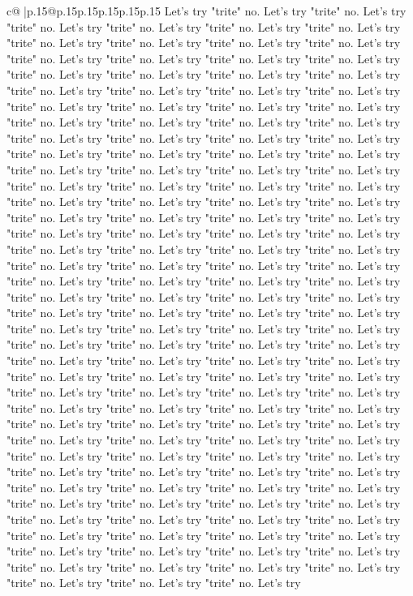 \documentclass{article}
\begin{document}
{\begin{supertabular}{c@{$\;$}|p{.15\linewidth}@{}p{.15\linewidth}p{.15\linewidth}p{.15\linewidth}p{.15\linewidth}p{.15\linewidth}}
{{{Let's try "trite" no. Let's try "trite" no. Let's try "trite" no. Let's try "trite" no. Let's try "trite" no. Let's try "trite" no. Let's try "trite" no. Let's try "trite" no. Let's try "trite" no. Let's try "trite" no. Let's try "trite" no. Let's try "trite" no. Let's try "trite" no. Let's try "trite" no. Let's try "trite" no. Let's try "trite" no. Let's try "trite" no. Let's try "trite" no. Let's try "trite" no. Let's try "trite" no. Let's try "trite" no. Let's try "trite" no. Let's try "trite" no. Let's try "trite" no. Let's try "trite" no. Let's try "trite" no. Let's try "trite" no. Let's try "trite" no. Let's try "trite" no. Let's try "trite" no. Let's try "trite" no. Let's try "trite" no. Let's try "trite" no. Let's try "trite" no. Let's try "trite" no. Let's try "trite" no. Let's try "trite" no. Let's try "trite" no. Let's try "trite" no. Let's try "trite" no. Let's try "trite" no. Let's try "trite" no. Let's try "trite" no. Let's try "trite" no. Let's try "trite" no. Let's try "trite" no. Let's try "trite" no. Let's try "trite" no. Let's try "trite" no. Let's try "trite" no. Let's try "trite" no. Let's try "trite" no. Let's try "trite" no. Let's try "trite" no. Let's try "trite" no. Let's try "trite" no. Let's try "trite" no. Let's try "trite" no. Let's try "trite" no. Let's try "trite" no. Let's try "trite" no. Let's try "trite" no. Let's try "trite" no. Let's try "trite" no. Let's try "trite" no. Let's try "trite" no. Let's try "trite" no. Let's try "trite" no. Let's try "trite" no. Let's try "trite" no. Let's try "trite" no. Let's try "trite" no. Let's try "trite" no. Let's try "trite" no. Let's try "trite" no. Let's try "trite" no. Let's try "trite" no. Let's try "trite" no. Let's try "trite" no. Let's try "trite" no. Let's try "trite" no. Let's try "trite" no. Let's try "trite" no. Let's try "trite" no. Let's try "trite" no. Let's try "trite" no. Let's try "trite" no. Let's try "trite" no. Let's try "trite" no. Let's try "trite" no. Let's try "trite" no. Let's try "trite" no. Let's try "trite" no. Let's try "trite" no. Let's try "trite" no. Let's try "trite" no. Let's try "trite" no. Let's try "trite" no. Let's try "trite" no. Let's try "trite" no. Let's try "trite" no. Let's try "trite" no. Let's try "trite" no. Let's try "trite" no. Let's try "trite" no. Let's try "trite" no. Let's try "trite" no. Let's try "trite" no. Let's try "trite" no. Let's try "trite" no. Let's try "trite" no. Let's try "trite" no. Let's try "trite" no. Let's try "trite" no. Let's try "trite" no. Let's try "trite" no. Let's try "trite" no. Let's try "trite" no. Let's try "trite" no. Let's try "trite" no. Let's try "trite" no. Let's try "trite" no. Let's try "trite" no. Let's try "trite" no. Let's try "trite" no. Let's try "trite" no. Let's try "trite" no. Let's try "trite" no. Let's try "trite" no. Let's try "trite" no. Let's try "trite" no. Let's try "trite" no. Let's try "trite" no. Let's try "trite" no. Let's try "trite" no. Let's try "trite" no. Let's try "trite" no. Let's try "trite" no. Let's try "trite" no. Let's try "trite" no. Let's try "trite" no. Let's try "trite" no. Let's try "trite" no. Let's try "trite" no. Let's try "trite" no. Let's try }}}
\end{supertabular}}
\end{document}
